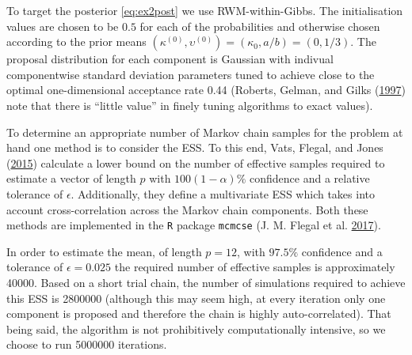 \documentclass[11pt,]{book}
\begin{document}
To target the posterior \eqref{eq:ex2post} we use RWM-within-Gibbs. The
initialisation values are chosen to be \(0.5\) for each of the
probabilities and otherwise chosen according to the prior means
\((\kappa^{(0)}, \upsilon^{(0)}) = (\kappa_0, a/b) = (0, 1/3)\). The
proposal distribution for each component is Gaussian with indivual
componentwise standard deviation parameters tuned to achieve close to
the optimal one-dimensional acceptance rate 0.44 (Roberts, Gelman, and
Gilks (\protect\hyperlink{ref-roberts1997weak}{1997}) note that there is
``little value'' in finely tuning algorithms to exact values).

\begin{table}[!h]

\caption{\label{tab:unnamed-chunk-9}Scaling and resultant acceptance rates for each component.}
\centering
{}
\end{table}

To determine an appropriate number of Markov chain samples for the
problem at hand one method is to consider the ESS. To this end, Vats,
Flegal, and Jones (\protect\hyperlink{ref-vats2015multivariate}{2015})
calculate a lower bound on the number of effective samples required to
estimate a vector of length \(p\) with \(100(1 - \alpha)\%\) confidence
and a relative tolerance of \(\epsilon\). Additionally, they define a
multivariate ESS which takes into account cross-correlation across the
Markov chain components. Both these methods are implemented in the
\texttt{R} package \texttt{mcmcse} (J. M. Flegal et al.
\protect\hyperlink{ref-mcmcse}{2017}).

In order to estimate the mean, of length \(p = 12\), with \(97.5\%\)
confidence and a tolerance of \(\epsilon = 0.025\) the required number
of effective samples is approximately 40000. Based on a short trial
chain, the number of simulations required to achieve this ESS is 2800000
(although this may seem high, at every iteration only one component is
proposed and therefore the chain is highly auto-correlated). That being
said, the algorithm is not prohibitively computationally intensive, so
we choose to run 5000000 iterations.
\end{document}
